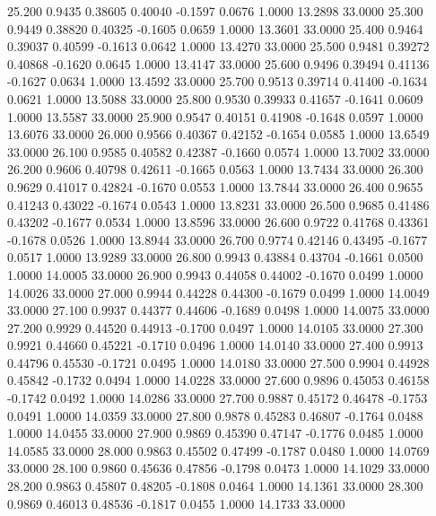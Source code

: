   25.200   0.9435   0.38605   0.40040  -0.1597   0.0676   1.0000  13.2898  33.0000
  25.300   0.9449   0.38820   0.40325  -0.1605   0.0659   1.0000  13.3601  33.0000
  25.400   0.9464   0.39037   0.40599  -0.1613   0.0642   1.0000  13.4270  33.0000
  25.500   0.9481   0.39272   0.40868  -0.1620   0.0645   1.0000  13.4147  33.0000
  25.600   0.9496   0.39494   0.41136  -0.1627   0.0634   1.0000  13.4592  33.0000
  25.700   0.9513   0.39714   0.41400  -0.1634   0.0621   1.0000  13.5088  33.0000
  25.800   0.9530   0.39933   0.41657  -0.1641   0.0609   1.0000  13.5587  33.0000
  25.900   0.9547   0.40151   0.41908  -0.1648   0.0597   1.0000  13.6076  33.0000
  26.000   0.9566   0.40367   0.42152  -0.1654   0.0585   1.0000  13.6549  33.0000
  26.100   0.9585   0.40582   0.42387  -0.1660   0.0574   1.0000  13.7002  33.0000
  26.200   0.9606   0.40798   0.42611  -0.1665   0.0563   1.0000  13.7434  33.0000
  26.300   0.9629   0.41017   0.42824  -0.1670   0.0553   1.0000  13.7844  33.0000
  26.400   0.9655   0.41243   0.43022  -0.1674   0.0543   1.0000  13.8231  33.0000
  26.500   0.9685   0.41486   0.43202  -0.1677   0.0534   1.0000  13.8596  33.0000
  26.600   0.9722   0.41768   0.43361  -0.1678   0.0526   1.0000  13.8944  33.0000
  26.700   0.9774   0.42146   0.43495  -0.1677   0.0517   1.0000  13.9289  33.0000
  26.800   0.9943   0.43884   0.43704  -0.1661   0.0500   1.0000  14.0005  33.0000
  26.900   0.9943   0.44058   0.44002  -0.1670   0.0499   1.0000  14.0026  33.0000
  27.000   0.9944   0.44228   0.44300  -0.1679   0.0499   1.0000  14.0049  33.0000
  27.100   0.9937   0.44377   0.44606  -0.1689   0.0498   1.0000  14.0075  33.0000
  27.200   0.9929   0.44520   0.44913  -0.1700   0.0497   1.0000  14.0105  33.0000
  27.300   0.9921   0.44660   0.45221  -0.1710   0.0496   1.0000  14.0140  33.0000
  27.400   0.9913   0.44796   0.45530  -0.1721   0.0495   1.0000  14.0180  33.0000
  27.500   0.9904   0.44928   0.45842  -0.1732   0.0494   1.0000  14.0228  33.0000
  27.600   0.9896   0.45053   0.46158  -0.1742   0.0492   1.0000  14.0286  33.0000
  27.700   0.9887   0.45172   0.46478  -0.1753   0.0491   1.0000  14.0359  33.0000
  27.800   0.9878   0.45283   0.46807  -0.1764   0.0488   1.0000  14.0455  33.0000
  27.900   0.9869   0.45390   0.47147  -0.1776   0.0485   1.0000  14.0585  33.0000
  28.000   0.9863   0.45502   0.47499  -0.1787   0.0480   1.0000  14.0769  33.0000
  28.100   0.9860   0.45636   0.47856  -0.1798   0.0473   1.0000  14.1029  33.0000
  28.200   0.9863   0.45807   0.48205  -0.1808   0.0464   1.0000  14.1361  33.0000
  28.300   0.9869   0.46013   0.48536  -0.1817   0.0455   1.0000  14.1733  33.0000
